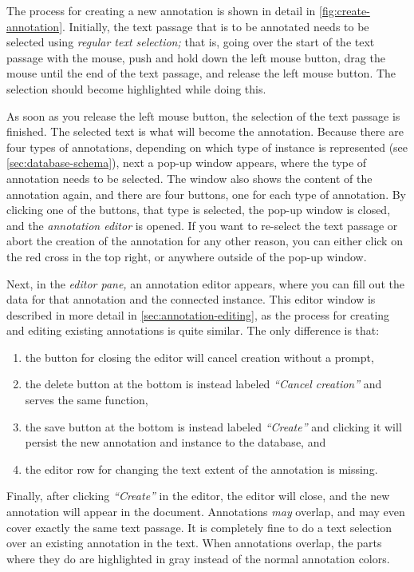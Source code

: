The process for creating a new annotation is shown in detail in \cref{fig:create-annotation}.
Initially, the text passage that is to be annotated needs to be selected using \emph{regular text selection;}
that is, going over the start of the text passage with the mouse, push and hold down the left mouse button, drag the mouse until the end of the text passage, and release the left mouse button.
The selection should become highlighted while doing this.

As soon as you release the left mouse button, the selection of the text passage is finished.
The selected text is what will become the annotation.
Because there are four types of annotations, depending on which type of instance is represented (see \cref{sec:database-schema}), next a pop-up window appears, where the type of annotation needs to be selected.
The window also shows the content of the annotation again, and there are four buttons, one for each type of annotation.
By clicking one of the buttons, that type is selected, the pop-up window is closed, and the \emph{annotation editor} is opened.
If you want to re-select the text passage or abort the creation of the annotation for any other reason, you can either click on the red cross in the top right, or anywhere outside of the pop-up window.

Next, in the \emph{editor pane,} an annotation editor appears, where you can fill out the data for that annotation and the connected instance.
This editor window is described in more detail in \cref{sec:annotation-editing}, as the process for creating and editing existing annotations is quite similar.
The only difference is that:

\begin{enumerate}
  \item the button for closing the editor will cancel creation without a prompt,
  \item the delete button at the bottom is instead labeled \emph{\enquote{Cancel creation}} and serves the same function,
  \item the save button at the bottom is instead labeled \emph{\enquote{Create}} and clicking it will persist the new annotation and instance to the database, and
  \item the editor row for changing the text extent of the annotation is missing.
\end{enumerate}

Finally, after clicking \emph{\enquote{Create}} in the editor, the editor will close, and the new annotation will appear in the document.
Annotations \emph{may} overlap, and may even cover exactly the same text passage.
It is completely fine to do a text selection over an existing annotation in the text.
When annotations overlap, the parts where they do are highlighted in gray instead of the normal annotation colors.

